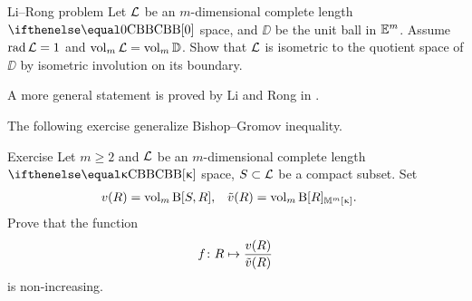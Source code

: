 \begin{thm}{Li--Rong problem}
Let $\mathcal{L}$ be an $m$-dimensional complete length $\Alex0$ space,
and $\DD$ be the unit ball in $\mathbb{E}^m$.
Assume $\mathop{\rm rad}\nolimits\mathcal{L}=1$ and $\mathop{\rm vol}\nolimits_m\mathcal{L}=\mathop{\rm vol}\nolimits_m\mathbb{D}$.
Show that $\mathcal{L}$ is isometric to the quotient space of  $\DD$ 
by isometric involution on its boundary.
\end{thm}

A more general statement is proved by Li and Rong in \cite{li-rong}.

The following exercise generalize Bishop--Gromov inequality.

\begin{thm}{Exercise}\label{thm:bishop-gromov-gen}
Let $m\ge 2$ and 
$\mathcal{L}$ be an $m$-dimensional complete length $\Alex\kappa$ space, 
$S\subset \spc{L}$ be a compact subset.
Set
\begin{align*}
v(R)&=\mathop{\rm vol}\nolimits_m\mathrm{B}{}[S,R],
&
\tilde v(R)&=\mathop{\rm vol}\nolimits_m\mathrm{B}{}[R]_{\mathbb{M}_{{}}^{m}[{\upkappa}]}.
\end{align*}
Prove that the function
\[f\:R\mapsto \frac{v(R)}{\~v(R)}\] 
is non-increasing.
\end{thm}
